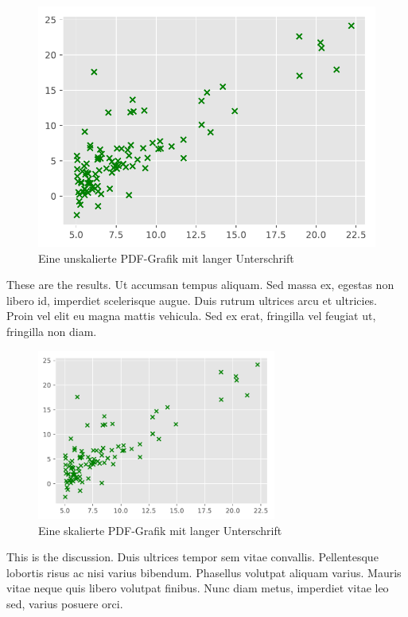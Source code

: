\begin{figure}[htp]
\hypertarget{ref_a_pdf_figure}{%
\centering
\includegraphics{assets/ex1_food_truck_profit.pdf}
\caption[Eine unskalierte PDF-Grafik]{Eine unskalierte PDF-Grafik mit langer Unterschrift
\autocite[vgl.][13]{Perez_PythonEcosystem_2011}}\label{ref_a_pdf_figure}
}
\end{figure}
These are the results. Ut accumsan tempus aliquam. Sed massa ex,
egestas non libero id, imperdiet scelerisque augue. Duis rutrum
ultrices arcu et ultricies. Proin vel elit eu magna mattis vehicula.
Sed ex erat, fringilla vel feugiat ut, fringilla non diam.

\begin{figure}[htp]
\hypertarget{ref_a_scaled_pdf_figure}{%
\centering
\includegraphics[width=0.70\textwidth]{assets/ex1_food_truck_profit.pdf}
\caption[Eine skalierte PDF-Grafik]{Eine skalierte PDF-Grafik mit langer Unterschrift
\autocite[vgl.][13]{Perez_PythonEcosystem_2011}}\label{ref_a_scaled_pdf_figure}
}
\end{figure}
This is the discussion. Duis ultrices tempor sem vitae convallis.
Pellentesque lobortis risus ac nisi varius bibendum. Phasellus
volutpat aliquam varius. Mauris vitae neque quis libero volutpat
finibus. Nunc diam metus, imperdiet vitae leo sed, varius posuere
orci.


